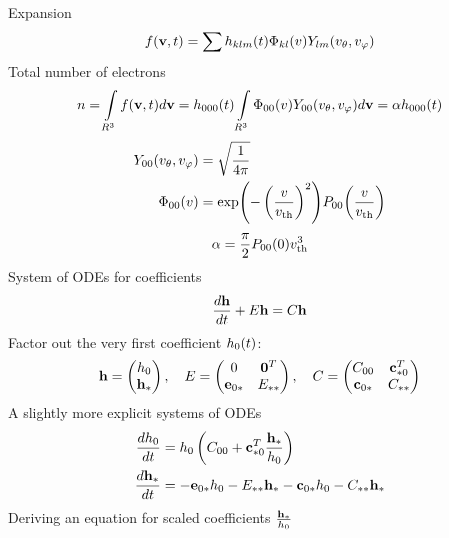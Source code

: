 \documentclass{article}[draft]
\begin{document}
Expansion
\begin{align*}
f\of{\vect{v},t} = \sum h_{klm}\of{t} \Phi_{kl}\of{\vr} Y_{lm}\of{\vtheta, \vphi}
\end{align*}
Total number of electrons
\begin{align*}
n = \myint_{R^3} f\of{\vect{v},t} d\vect{v} = h_{000}\of{t} \myint_{R^3} \Phi_{00}\of{\vr} Y_{00}\of{\vtheta, \vphi} d\vect{v} = \alpha h_{000}\of{t}
\end{align*}
\begin{align*}
Y_{00}\of{\vtheta, \vphi} &= \sqrt{\frac1{4\pi}}
\\
\Phi_{00}\of{\vr} &= \exp\of{ -\left( \frac{v}{\vth} \right)^2 } P_{00} \of{\frac{v}{\vth}}
\end{align*}
\begin{align*}
\alpha = \frac\pi{2} P_{00}\of{0} \vth^3
\end{align*}
System of ODEs for coefficients
\begin{align*}
\frac{d \mathbf{h}}{dt} + E \mathbf{h} = C \mathbf{h}
\end{align*}
Factor out the very first coefficient $h_0\of{t}$:
\begin{align*}
\mathbf{h} = 
\begin{pmatrix}
h_0 \\ \mathbf{h}_\ast
\end{pmatrix}
,\quad
E = 
\begin{pmatrix}
0 & \mathbf{0}^T \\
\mathbf{e}_{0\ast} & E_{\ast\ast}
\end{pmatrix}
,\quad
C = 
\begin{pmatrix}
C_{00} & \mathbf{c}_{\ast 0}^T \\
\mathbf{c}_{0\ast} & C_{\ast\ast}
\end{pmatrix}
\end{align*}
A slightly more explicit systems of ODEs
\begin{align*}
\frac{dh_0}{dt} &= h_0 \left(C_{00} + \mathbf{c}_{\ast 0}^T \frac{\mathbf{h}_\ast}{h_0} \right)
\\
\frac{d \mathbf{h}_\ast}{dt} &= - \mathbf{e}_{0\ast} h_0 
- E_{\ast\ast} \mathbf{h}_\ast
- \mathbf{c}_{0\ast} h_0 
- C_{\ast\ast} \mathbf{h}_\ast
\end{align*}
Deriving an equation for scaled coefficients $\frac{\mathbf{h}_\ast}{h_0}$
\end{document}
